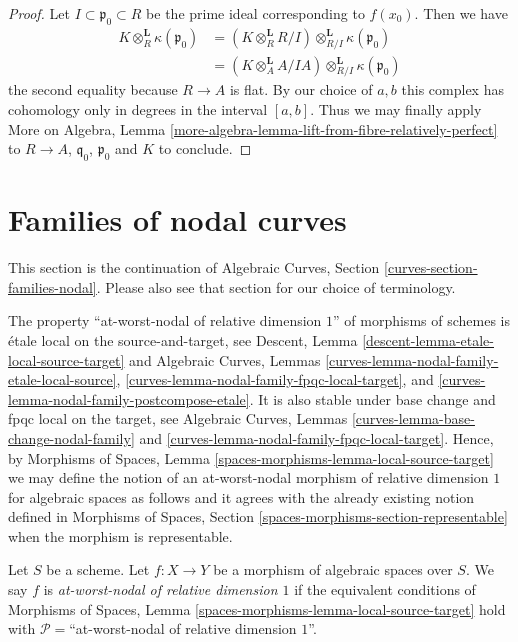 \begin{proof}
\medskip\noindent
Let $I \subset \mathfrak p_0 \subset R$ be the prime
ideal corresponding to $f(x_0)$. Then we have
\begin{align*}
K \otimes_R^\mathbf{L} \kappa(\mathfrak p_0)
& =
(K \otimes_R^\mathbf{L} R/I) \otimes_{R/I}^\mathbf{L}
\kappa(\mathfrak p_0) \\
& =
(K \otimes_A^\mathbf{L} A/IA) \otimes_{R/I}^\mathbf{L} \kappa(\mathfrak p_0)
\end{align*}
the second equality because $R \to A$ is flat.
By our choice of $a, b$ this complex has cohomology
only in degrees in the interval $[a, b]$.
Thus we may finally apply
More on Algebra, Lemma
\ref{more-algebra-lemma-lift-from-fibre-relatively-perfect}
to $R \to A$, $\mathfrak q_0$, $\mathfrak p_0$ and $K$
to conclude.
\end{proof}







\section{Families of nodal curves}
\label{section-families-nodal}

\noindent
This section is the continuation of
Algebraic Curves, Section \ref{curves-section-families-nodal}.
Please also see that section for our choice
of terminology.

\medskip\noindent
The property ``at-worst-nodal of relative dimension $1$''
of morphisms of schemes is \'etale local on the source-and-target, see
Descent, Lemma \ref{descent-lemma-etale-local-source-target}
and
Algebraic Curves, Lemmas \ref{curves-lemma-nodal-family-etale-local-source},
\ref{curves-lemma-nodal-family-fpqc-local-target}, and
\ref{curves-lemma-nodal-family-postcompose-etale}.
It is also stable under base change and fpqc local on the target, see
Algebraic Curves, Lemmas \ref{curves-lemma-base-change-nodal-family} and
\ref{curves-lemma-nodal-family-fpqc-local-target}. Hence, by
Morphisms of Spaces, Lemma \ref{spaces-morphisms-lemma-local-source-target}
we may define the notion of an at-worst-nodal morphism of relative
dimension $1$ for algebraic spaces as follows and it agrees with the
already existing notion defined in
Morphisms of Spaces, Section \ref{spaces-morphisms-section-representable}
when the morphism is representable.

\begin{definition}
\label{definition-nodal-family}
Let $S$ be a scheme.
Let $f : X \to Y$ be a morphism of algebraic spaces over $S$.
We say $f$ is {\it at-worst-nodal of relative dimension $1$}
if the equivalent conditions of
Morphisms of Spaces, Lemma \ref{spaces-morphisms-lemma-local-source-target}
hold with $\mathcal{P} =$``at-worst-nodal of relative dimension $1$''.
\end{definition}

